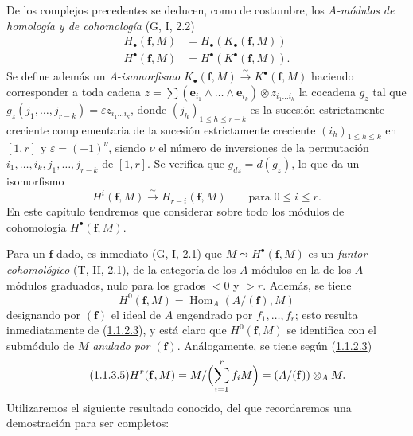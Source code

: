 \begin{env}[1.1.3]
\label{III.1.1.3-fr}
De los complejos precedentes se deducen, como de costumbre, los \emph{$A$-módulos
de homología y de cohomología} (G, I, 2.2)
\begin{align}
\label{III.1.1.3.1-fr}
\tag{1.1.3.1}
H_\bullet(\mathbf f,M)&=H_\bullet(K_\bullet(\mathbf f,M))\\
\label{III.1.1.3.2-fr}
\tag{1.1.3.2}
H^\bullet(\mathbf f,M)&=H^\bullet(K^\bullet(\mathbf f,M)).
\end{align}
Se define además un $A$-\emph{isomorfismo}
$K_\bullet(\mathbf f,M)\xrightarrow{\sim}K^\bullet(\mathbf f,M)$ haciendo
corresponder a toda cadena
$z=\sum(\mathbf e_{i_1}\wedge\ldots\wedge\mathbf e_{i_k})\otimes
z_{i_1\ldots i_k}$ la cocadena $g_z$ tal que
$g_z(j_1,\ldots,j_{r-k})=\varepsilon z_{i_1\ldots i_k}$, donde
$(j_h)_{1\leq h\leq r-k}$ es la sucesión estrictamente creciente complementaria
de la sucesión estrictamente creciente $(i_h)_{1\leq h\leq k}$ en $[1,r]$ y
$\varepsilon=(-1)^\nu$, siendo $\nu$ el número de inversiones de la permutación
$i_1,\ldots,i_k,j_1,\ldots,j_{r-k}$ de $[1,r]$. Se verifica que
$g_{dz}=d(g_z)$, lo que da un isomorfismo
\begin{equation}
\label{III.1.1.3.3-fr}
\tag{1.1.3.3}
H^i(\mathbf f,M)\xrightarrow{\sim}H_{r-i}(\mathbf f,M)
\qquad\text{para }0\leq i\leq r.
\end{equation}
En este capítulo tendremos que considerar sobre todo los módulos de cohomología
$H^\bullet(\mathbf f,M)$.

Para un $\mathbf f$ dado, es inmediato (G, I, 2.1) que
$M\leadsto H^\bullet(\mathbf f,M)$ es un \emph{funtor cohomológico}
(T, II, 2.1), de la categoría de los $A$-módulos en la de los $A$-módulos
graduados, nulo para los grados $<0$ y $>r$. Además, se tiene
\begin{equation}
\label{III.1.1.3.4-fr}
\tag{1.1.3.4}
H^0(\mathbf f,M)=\operatorname{Hom}_A(A/(\mathbf f),M)
\end{equation}
designando por $(\mathbf f)$ el ideal de $A$ engendrado por
$f_1,\ldots,f_r$; esto resulta inmediatamente de
(\hyperref[III.1.1.2.3-fr]{1.1.2.3}), y está claro que
$H^0(\mathbf f,M)$ se identifica con el submódulo de $M$ \emph{anulado por
$(\mathbf f)$}. Análogamente, se tiene según
(\hyperref[III.1.1.2.3-fr]{1.1.2.3})
\begin{equation}
\label{III.1.1.3.5-fr}
\tag{1.1.3.5}
H^r(\mathbf f,M)=M/\Bigl(\sum_{i=1}^r f_iM\Bigr)
=(A/(\mathbf f))\otimes_A M.
\end{equation}
Utilizaremos el siguiente resultado conocido, del que recordaremos una
demostración para ser completos:
\end{env}

